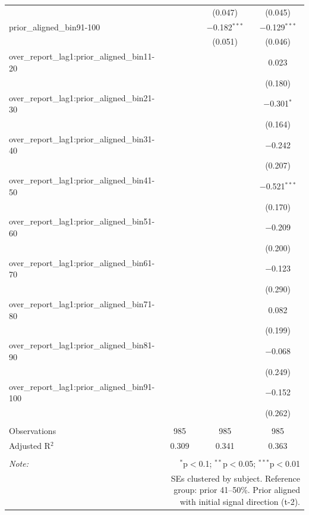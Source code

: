 \begin{table}[!htbp]
\begin{tabular}{@{\extracolsep{5pt}}lccc}
  &  & (0.047) & (0.045) \\ 
  prior\_aligned\_bin91-100 &  & $-$0.182$^{***}$ & $-$0.129$^{***}$ \\ 
  &  & (0.051) & (0.046) \\ 
  over\_report\_lag1:prior\_aligned\_bin11-20 &  &  & 0.023 \\ 
  &  &  & (0.180) \\ 
  over\_report\_lag1:prior\_aligned\_bin21-30 &  &  & $-$0.301$^{*}$ \\ 
  &  &  & (0.164) \\ 
  over\_report\_lag1:prior\_aligned\_bin31-40 &  &  & $-$0.242 \\ 
  &  &  & (0.207) \\ 
  over\_report\_lag1:prior\_aligned\_bin41-50 &  &  & $-$0.521$^{***}$ \\ 
  &  &  & (0.170) \\ 
  over\_report\_lag1:prior\_aligned\_bin51-60 &  &  & $-$0.209 \\ 
  &  &  & (0.200) \\ 
  over\_report\_lag1:prior\_aligned\_bin61-70 &  &  & $-$0.123 \\ 
  &  &  & (0.290) \\ 
  over\_report\_lag1:prior\_aligned\_bin71-80 &  &  & 0.082 \\ 
  &  &  & (0.199) \\ 
  over\_report\_lag1:prior\_aligned\_bin81-90 &  &  & $-$0.068 \\ 
  &  &  & (0.249) \\ 
  over\_report\_lag1:prior\_aligned\_bin91-100 &  &  & $-$0.152 \\ 
  &  &  & (0.262) \\ 
 \hline \\[-1.8ex] 
Observations & 985 & 985 & 985 \\ 
Adjusted R$^{2}$ & 0.309 & 0.341 & 0.363 \\ 
\hline 
\hline \\[-1.8ex] 
\textit{Note:}  & \multicolumn{3}{r}{$^{*}$p$<$0.1; $^{**}$p$<$0.05; $^{***}$p$<$0.01} \\ 
 & \multicolumn{3}{r}{SEs clustered by subject. Reference group: prior 41--50\%. Prior aligned with initial signal direction (t-2).} \\ 
\end{tabular} 
\end{table} 
